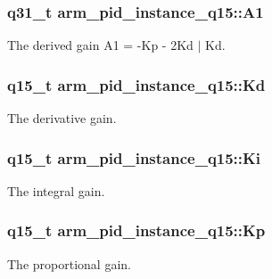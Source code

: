 \subsubsection[{\texorpdfstring{A1}{A1}}]{\setlength{\rightskip}{0pt plus 5cm}q31\+\_\+t arm\+\_\+pid\+\_\+instance\+\_\+q15\+::\+A1}\hypertarget{structarm__pid__instance__q15_a1b8412c517071962a9acfdc6778906ec}{}\label{structarm__pid__instance__q15_a1b8412c517071962a9acfdc6778906ec}
The derived gain A1 = -\/\+Kp -\/ 2\+Kd $\vert$ Kd. 
\subsubsection[{\texorpdfstring{Kd}{Kd}}]{\setlength{\rightskip}{0pt plus 5cm}q15\+\_\+t arm\+\_\+pid\+\_\+instance\+\_\+q15\+::\+Kd}\hypertarget{structarm__pid__instance__q15_af5d4b53091f19eff7536636b7cc43111}{}\label{structarm__pid__instance__q15_af5d4b53091f19eff7536636b7cc43111}
The derivative gain. 
\subsubsection[{\texorpdfstring{Ki}{Ki}}]{\setlength{\rightskip}{0pt plus 5cm}q15\+\_\+t arm\+\_\+pid\+\_\+instance\+\_\+q15\+::\+Ki}\hypertarget{structarm__pid__instance__q15_a0dcc19d5c8f7bc401acea9e8318cd777}{}\label{structarm__pid__instance__q15_a0dcc19d5c8f7bc401acea9e8318cd777}
The integral gain. 
\subsubsection[{\texorpdfstring{Kp}{Kp}}]{\setlength{\rightskip}{0pt plus 5cm}q15\+\_\+t arm\+\_\+pid\+\_\+instance\+\_\+q15\+::\+Kp}\hypertarget{structarm__pid__instance__q15_ad228aae24a1b6d855c93a8b9bbc1c4f1}{}\label{structarm__pid__instance__q15_ad228aae24a1b6d855c93a8b9bbc1c4f1}
The proportional gain. 
